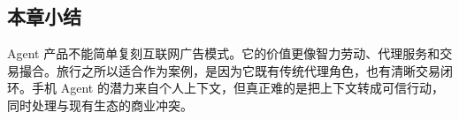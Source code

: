 \subsection{本章小结}

Agent 产品不能简单复刻互联网广告模式。它的价值更像智力劳动、代理服务和交易撮合。旅行之所以适合作为案例，是因为它既有传统代理角色，也有清晰交易闭环。手机 Agent 的潜力来自个人上下文，但真正难的是把上下文转成可信行动，同时处理与现有生态的商业冲突。

